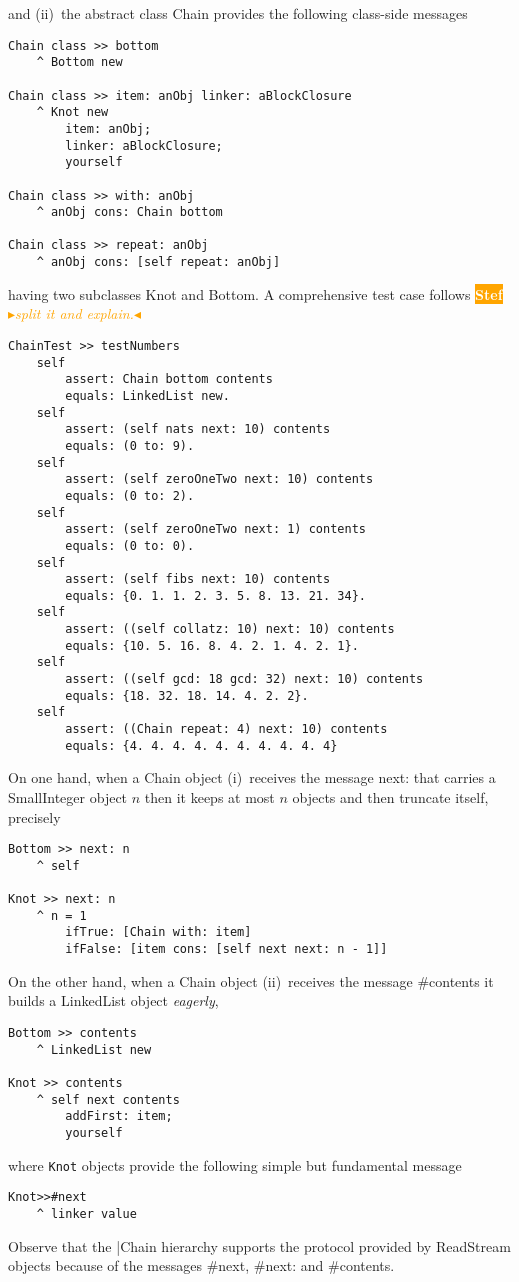 \documentclass[a4paper,11pt]{article}
\newcommand{\nb}[3]{
		{\colorbox{#2}{\bfseries\sffamily\scriptsize\textcolor{white}{#1}}}
		{\textcolor{#2}{\sf\small$\blacktriangleright$\textit{#3}$\blacktriangleleft$}}}
\newcommand{\nb}[3]{}
\newcommand{\sd}[1]{\nb{Stef}{orange}{#1}}
\newcommand{\ct}[1]{{\textsf{#1}}\xspace}
\begin{document}
and (ii)~the abstract class \ct{Chain} provides the following class-side messages
\begin{verbatim}
Chain class >> bottom
    ^ Bottom new

Chain class >> item: anObj linker: aBlockClosure
    ^ Knot new
        item: anObj;
        linker: aBlockClosure;
        yourself

Chain class >> with: anObj
    ^ anObj cons: Chain bottom

Chain class >> repeat: anObj
    ^ anObj cons: [self repeat: anObj]
\end{verbatim}
having two subclasses \ct{Knot} and \ct{Bottom}. A comprehensive
test case follows \sd{split it and explain.}
\begin{verbatim}
ChainTest >> testNumbers
    self
        assert: Chain bottom contents
        equals: LinkedList new.
    self
        assert: (self nats next: 10) contents
        equals: (0 to: 9).
    self
        assert: (self zeroOneTwo next: 10) contents
        equals: (0 to: 2).
    self
        assert: (self zeroOneTwo next: 1) contents
        equals: (0 to: 0).
    self
        assert: (self fibs next: 10) contents
        equals: {0. 1. 1. 2. 3. 5. 8. 13. 21. 34}.
    self
        assert: ((self collatz: 10) next: 10) contents
        equals: {10. 5. 16. 8. 4. 2. 1. 4. 2. 1}.
    self
        assert: ((self gcd: 18 gcd: 32) next: 10) contents
        equals: {18. 32. 18. 14. 4. 2. 2}.
    self
        assert: ((Chain repeat: 4) next: 10) contents
        equals: {4. 4. 4. 4. 4. 4. 4. 4. 4. 4}
\end{verbatim}

On one hand, when a \ct{Chain} object (i)~receives the message
\ct{next:} that carries a \ct{SmallInteger} object $n$ then it keeps at most
$n$ objects and then truncate itself, precisely
\begin{verbatim}
Bottom >> next: n
    ^ self

Knot >> next: n
    ^ n = 1
        ifTrue: [Chain with: item]
        ifFalse: [item cons: [self next next: n - 1]]
\end{verbatim}

On the other hand, when a \ct{Chain} object (ii)~receives the message
\ct{#contents} it builds a \ct{LinkedList} object \textit{eagerly},
\begin{verbatim}
Bottom >> contents
    ^ LinkedList new

Knot >> contents
    ^ self next contents
        addFirst: item;
        yourself
\end{verbatim}
where \Verb|Knot| objects provide the following simple but fundamental message
\begin{verbatim}
Knot>>#next
    ^ linker value
\end{verbatim}
Observe that the \ct{|Chain} hierarchy supports the protocol provided
by \ct{ReadStream} objects because of the messages \ct{#next}, \ct{#next:}
and \ct{#contents}.
\end{document}
